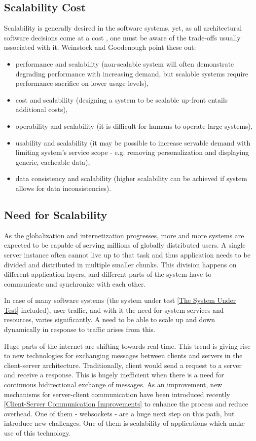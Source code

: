 \documentclass{uvamscse}
\begin{document}
\subsection{Scalability Cost}
Scalability is generally desired in the software systems, yet, as all architectural software decisions come at a cost \cite{GerHeiBench}, one must be aware of the trade-offs usually associated with it. Weinstock and Goodenough \cite{WeinstockOnSystem2006} point these out:
\begin{itemize}
  \item performance and scalability (non-scalable system will often demonstrate degrading performance with increasing demand, but scalable systems require performance sacrifice on lower usage levels),
  \item cost and scalability (designing a system to be scalable up-front entails additional costs),
  \item operability and scalability (it is difficult for humans to operate large systems),
  \item usability and scalability (it may be possible to increase servable demand with limiting system's service scope - e.g. removing personalization and displaying generic, cacheable data),
  \item data consistency and scalability (higher scalability can be achieved if system allows for data inconsistencies).
\end{itemize}

\subsection{Need for Scalability}

As the globalization and internetization progresses, more and more systems are expected to be capable of serving millions of globally distributed users. A single server instance often cannot live up to that task and thus application needs to be divided and distributed in multiple smaller chunks. This division happens on different application layers, and different parts of the system have to communicate and synchronize with each other.

In case of many software systems (the system under test \ref{The System Under Test} included), user traffic, and with it the need for system services and resources, varies significantly. A need to be able to scale up and down dynamically in response to traffic arises from this.

Huge parts of the internet are shifting towards real-time. This trend is giving rise to new technologies for exchanging messages between clients and servers in the client-server architecture. Traditionally, client would send a request to a server and receive a response. This is hugely inefficient when there is a need for continuous bidirectional exchange of messages. As an improvement, new mechanisms for server-client communication have been introduced recently \ref{Client-Server Communication Improvements} to enhance the process and reduce overhead. One of them - websockets - are a huge next step on this path, but introduce new challenges. One of them is scalability of applications which make use of this technology.
\end{document}
